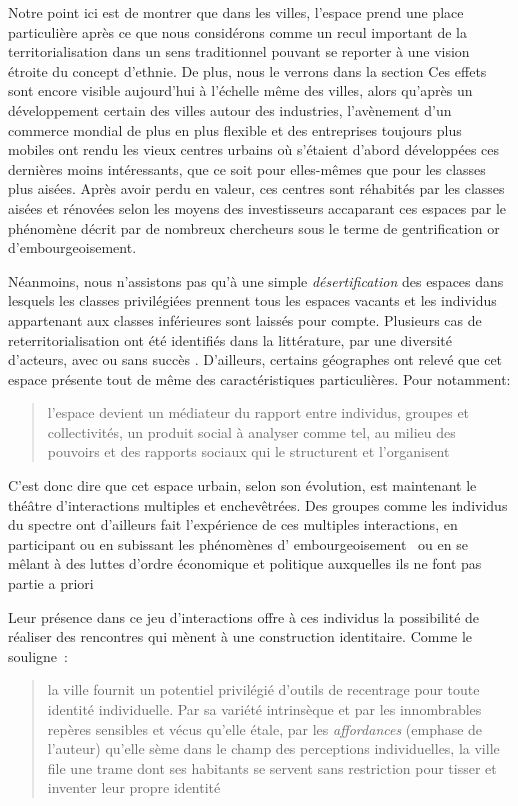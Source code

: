 Notre point ici est de montrer que dans les villes, l'espace prend une place particulière après ce que nous considérons comme un recul important de la territorialisation dans un sens traditionnel pouvant se reporter à une vision étroite du concept d'ethnie. 
De plus, nous le verrons dans la section  Ces effets sont encore visible aujourd'hui à l'échelle même des villes, alors qu'après un développement certain des villes autour des industries, l'avènement d'un commerce mondial de plus en plus flexible et des entreprises toujours plus mobiles ont rendu les vieux centres urbains où s'étaient d'abord développées ces dernières moins intéressants, que ce soit pour elles-mêmes que pour les classes plus aisées. 
Après avoir perdu en valeur, ces centres sont réhabités par les classes aisées et rénovées selon les moyens des investisseurs accaparant ces espaces par le phénomène décrit par de nombreux chercheurs sous le terme de gentrification or d'embourgeoisement.

Néanmoins, nous n'assistons pas qu'à une simple \emph{désertification} des espaces dans lesquels les classes privilégiées prennent tous les espaces vacants et les individus appartenant aux classes inférieures sont laissés pour compte.
Plusieurs cas de reterritorialisation ont été identifiés dans la littérature, par une diversité d'acteurs, avec ou sans succès \citet{Hatvany2005}. 
D'ailleurs, certains géographes ont relevé que cet espace présente tout de même des caractéristiques particulières. 
Pour \citeauthor{Courville1991} notamment: \blockquote[{\cite[41]{Courville1991}}][.]{l'espace devient un médiateur du rapport entre individus, groupes et collectivités, un produit social à analyser comme tel, au milieu des pouvoirs et des rapports sociaux qui le structurent et l'organisent}.

C'est donc dire que cet espace urbain, selon son évolution, est maintenant le théâtre d'interactions multiples et enchevêtrées. 
Des groupes comme les individus du spectre \lgbt{} ont d'ailleurs fait l'expérience de ces multiples interactions, en participant ou en subissant les phénomènes d’ embourgeoisement~\autocite{Podmore2001,Giraud2014,Hogan2005} ou en se mêlant à des luttes d'ordre économique et politique auxquelles ils ne font pas partie a priori~\autocite{Kelliher2014} 

Leur présence dans ce jeu d'interactions offre à ces individus la possibilité de réaliser des rencontres qui mènent à une construction identitaire. 
Comme le souligne~\citeauthor{DiMeo2007}: \blockquote[{\cite[81]{DiMeo2007}}][.]{\textelp{} la ville fournit un potentiel privilégié d’outils de recentrage pour toute identité individuelle. Par sa variété intrinsèque et par les innombrables repères sensibles et vécus qu’elle étale, par les \emph{affordances} (emphase de l'auteur) qu’elle sème dans le champ des perceptions individuelles, la ville file une trame dont ses habitants se servent sans restriction pour tisser et inventer leur propre identité}.

